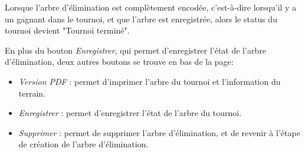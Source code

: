 Lorsque l'arbre d'élimination est complètement encodée, c'est-à-dire lorsqu'il y a un gagnant dans le tournoi, et que l'arbre est enregistrée, alors le status du tournoi devient "Tournoi terminé".\newline

En plus du bouton \textit{Enregistrer}, qui permet d'enregistrer l'état de l'arbre d'élimination, deux autres boutons se trouve en bas de la page:

\begin{itemize}
\item \textit{Version PDF} : permet d'imprimer l'arbre du tournoi et l'information du terrain.
\item \textit{Enregistrer} : permet d'enregistrer l'état de l'arbre du tournoi.
\item \textit{Supprimer} : permet de supprimer l'arbre d'élimination, et de revenir à l'étape de création de l'arbre d'élimination.
\end{itemize}
\bigskip